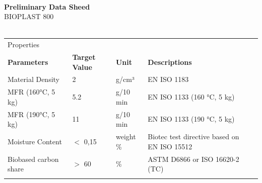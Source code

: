 \documentclass{article}
\begin{document}
\begin{flushleft}
\hspace{1cm}\\
\textbf{Preliminary Data Sheed}\\
BIOPLAST 800\\
\hspace{1cm}\\
\end{flushleft}
\begin{center}
\begin{tabularx}
{\textwidth}{X l  l  l  l }\rowcolor{color_title}Properties &  &  &  &  \\
\textbf{Parameters} & \textbf{Target Value} & \textbf{Unit} & \textbf{Descriptions} &  \\
Material Density  & 2 & g/cm³ & EN ISO 1183 &  \\
\arrayrulecolor{line_color}\hline
MFR (160°C, 5 kg) & 5.2 & g/10 min & EN ISO 1133 (160 °C, 5 kg) &  \\
\arrayrulecolor{line_color}\hline
MFR (190°C, 5 kg) & 11 & g/10 min & EN ISO 1133 (190 °C, 5 kg) &  \\
\arrayrulecolor{line_color}\hline
Moisture Content & \(<\) 0,15 & weight \% & Biotec test directive based on EN ISO 15512 &  \\
\arrayrulecolor{line_color}\hline
Biobased carbon share & \(>\) 60 & \% & ASTM D6866 or ISO 16620-2 (TC) &  \\
\arrayrulecolor{line_color}\hline

\end{tabularx}
\end{center}
\end{document}
